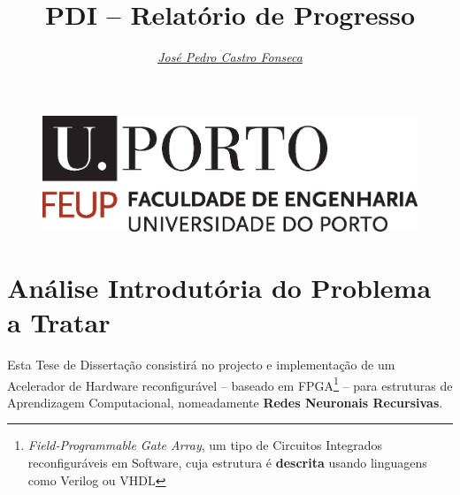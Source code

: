\documentclass[a4paper, onecolumn, 10pt]{article}
\title{\Huge PDI -- Relatório de Progresso}
\author{\itshape \href{mailto:ee11126@fe.up.pt}{José Pedro Castro Fonseca}   }
\begin{document}
\pagestyle{plain}

\begin{figure}
	\centering
	\includegraphics[scale=0.3]{logo_feup.eps}
\end{figure}
\sffamily
\maketitle



\rmfamily\pagestyle{fancy}
\section{Análise Introdutória do Problema a Tratar}
Esta Tese de Dissertação consistirá no projecto e implementação de um Acelerador de Hardware reconfigurável -- baseado em FPGA\footnote{\textit{Field-Programmable Gate Array}, um tipo de Circuitos Integrados reconfiguráveis em Software, cuja estrutura é \textbf{descrita} usando linguagens como Verilog ou VHDL} -- para estruturas de Aprendizagem Computacional, nomeadamente \textbf{Redes Neuronais Recursivas}. 	
\end{document}
